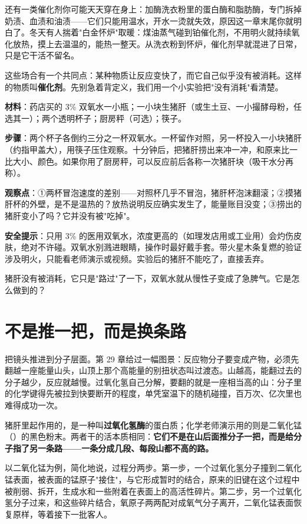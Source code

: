 还有一类催化剂你可能天天穿在身上：加酶洗衣粉里的蛋白酶和脂肪酶，专门拆掉奶渍、血渍和油渍——它们只能用温水，开水一烫就失效，原因这一章末尾你就明白了。冬天有人揣着"白金怀炉"取暖：煤油蒸气碰到铂催化剂，不用明火就持续氧化放热，摸上去温温的，能热一整天。从洗衣粉到怀炉，催化剂早就混进了日常，只是它干活不留名。

这些场合有一个共同点：某种物质让反应变快了，而它自己似乎没有被消耗。这样的物质叫\textbf{催化剂}。先别急着背定义，我们用一个小实验把"没有消耗"看清楚。

\begin{shiyan}
\textbf{材料}：药店买的 3\% 双氧水一小瓶；一小块生猪肝（或生土豆、一小撮酵母粉，任选其一）；两个透明杯子；厨房秤（可选）；筷子。

\textbf{步骤}：两个杯子各倒约三分之一杯双氧水。一杯留作对照，另一杯投入一小块猪肝（约指甲盖大），用筷子压住观察。十分钟后，把猪肝捞出来冲一冲，和原来比一比大小、颜色。如果你用了厨房秤，可以反应前后各称一次猪肝块（吸干水分再称）。

\textbf{观察点}：①两杯冒泡速度的差别——对照杯几乎不冒泡，猪肝杯泡沫翻滚；②摸猪肝杯的外壁，是不是温热的？放热说明反应确实发生了，能量账目没变；③捞出的猪肝变小了吗？它并没有被"吃掉"。

\textbf{安全提示}：只用 3\% 的医用双氧水，浓度更高的（如理发店用或工业用）会灼伤皮肤，绝对不许碰。双氧水别溅进眼睛，操作时最好戴手套。带火星木条复燃的验证涉及明火，只能看老师演示或视频。实验后的猪肝不能吃了，直接丢弃。
\end{shiyan}

猪肝没有被消耗，它只是"路过"了一下，双氧水就从慢性子变成了急脾气。它是怎么做到的？

\section{不是推一把，而是换条路}

把镜头推进到分子层面。第 29 章给过一幅图景：反应物分子要变成产物，必须先翻越一座能量山头，山顶上那个高能量的别扭状态叫过渡态。山越高，能翻过去的分子越少，反应就越慢。过氧化氢自己分解，要翻的就是一座相当高的山：分子里的化学键得先被拉到快要断开的程度，单凭室温下的随机碰撞，百万次、亿次里也难得成功一次。

猪肝里起作用的，是一种叫\textbf{过氧化氢酶}的蛋白质；化学老师演示用的则是二氧化锰（）的黑色粉末。两者干的活本质相同：\textbf{它们不是在山后面推分子一把，而是给分子指了另一条路——一条分成几段、每段山都不高的路。}

以二氧化锰为例，简化地说，过程分两步。第一步，一个过氧化氢分子撞到二氧化锰表面，被表面的锰原子"接住"，与它形成暂时的结合，原来的旧键在这个过程中被削弱、拆开，生成水和一些附着在表面上的高活性碎片。第二步，另一个过氧化氢分子过来，和这些碎片结合，氧原子两两配对成氧气分子离开，二氧化锰表面恢复原样，等着接下一批客人。

